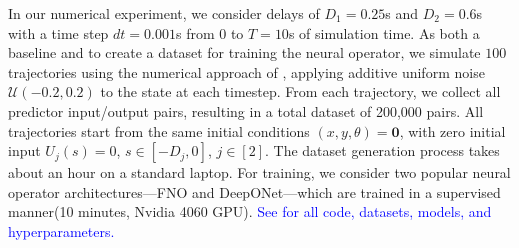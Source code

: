 \documentclass[letterpaper, 10 pt, conference]{ieeeconf}  %
\begin{document}
In our numerical experiment, we consider delays of $D_1 = 0.25$s and $D_2= 0.6$s with a time step $dt=0.001$s from $0$ to $T=10$s of simulation time. 
As both a baseline and to create a dataset for training the neural operator, we simulate $100$ trajectories using the numerical approach of \cite{Predictor_Feedback_For_Delay_Systems}, applying additive uniform noise $\mathcal{U}(-0.2, 0.2)$ to the state at each timestep. From each trajectory, we collect all predictor input/output pairs, resulting in a total dataset of 200,000 pairs. All trajectories start from the same initial conditions $(x, y, \theta) = \bm{0}$, with zero initial input $U_j(s) = 0$, $s \in [-D_j, 0]$, $j \in [2]$. The dataset generation process takes about an hour on a standard laptop. For training, we consider two popular neural operator architectures—FNO and DeepONet—which are trained in a supervised manner(10 minutes, Nvidia 4060 GPU). \textcolor{blue}{See \cite{ProjectGitHub} for all code, datasets, models, and hyperparameters.}


\end{document}
